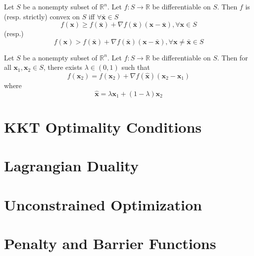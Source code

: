 			\begin{theorem}
				Let $S$ be a nonempty subset of $\mathbb{R}^n$. Let $f: S\rightarrow \mathbb{R}$ be differentiable on $S$. Then $f$ is (resp. strictly) convex on $S$ iff $\forall \bar{\mathbf{x}} \in S$
				\begin{equation}
					f(\mathbf{x}) \ge f(\bar{\mathbf{x}}) + \nabla f(\bar{\mathbf{x}}) (\mathbf{x} - \bar{\mathbf{x}}), \forall \mathbf{x} \in S
				\end{equation}
				(resp.)
				\begin{equation}
					f(\mathbf{x}) > f(\bar{\mathbf{x}}) + \nabla f(\bar{\mathbf{x}}) (\mathbf{x} - \bar{\mathbf{x}}), \forall \mathbf{x}\neq \bar{\mathbf{x}} \in S
				\end{equation}
			\end{theorem}

			\begin{theorem}
				Let $S$ be a nonempty subset of $\mathbb{R}^n$. Let $f: S\rightarrow \mathbb{R}$ be differentiable on $S$. Then for all $\mathbf{x}_1, \mathbf{x}_2 \in S$, there exists $\lambda \in (0, 1)$ such that
				\begin{equation}
					f(\mathbf{x}_2) = f(\mathbf{x}_2) + \nabla f(\hat{\mathbf{x}})(\mathbf{x}_2 - \mathbf{x}_1)
				\end{equation}
				where
				\begin{equation}
					\hat{\mathbf{x}} = \lambda \mathbf{x}_1 + (1 - \lambda) \mathbf{x}_2
				\end{equation}
			\end{theorem}

	\chapter{KKT Optimality Conditions}

	\chapter{Lagrangian Duality}

	\chapter{Unconstrained Optimization}

	\chapter{Penalty and Barrier Functions}